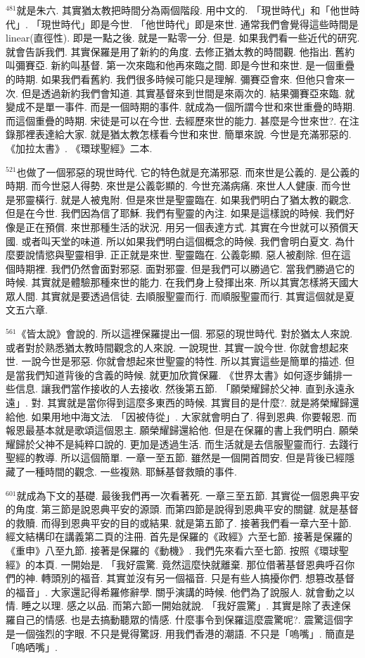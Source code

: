 \documentclass{book}
\begin{document}
$^{481}$就是朱六.
其實猶太教把時間分為兩個階段.
用中文的.
「現世時代」和「他世時代」.
「現世時代」即是今世.
「他世時代」即是來世.
通常我們會覺得這些時間是linear(直徑性).
即是一點之後.
就是一點零一分.
但是.
如果我們看一些近代的研究.
就會告訴我們.
其實保羅是用了新約的角度.
去修正猶太教的時間觀.
他指出.
舊約叫彌賽亞.
新約叫基督.
第一次來臨和他再來臨之間.
即是今世和來世.
是一個重疊的時期.
如果我們看舊約.
我們很多時候可能只是理解.
彌賽亞會來.
但他只會來一次.
但是透過新約我們會知道.
其實基督來到世間是來兩次的.
結果彌賽亞來臨.
就變成不是單一事件.
而是一個時期的事件.
就成為一個所謂今世和來世重疊的時期.
而這個重疊的時期.
宋徒是可以在今世.
去經歷來世的能力.
甚麼是今世來世?.
在注錄那裡表達給大家.
就是猶太教怎樣看今世和來世.
簡單來說.
今世是充滿邪惡的.
《加拉太書》.
《環球聖經》二本.

$^{521}$也做了一個邪惡的現世時代.
它的特色就是充滿邪惡.
而來世是公義的.
是公義的時期.
而今世惡人得勢.
來世是公義彰顯的.
今世充滿病痛.
來世人人健康.
而今世是邪靈橫行.
就是人被鬼附.
但是來世是聖靈臨在.
如果我們明白了猶太教的觀念.
但是在今世.
我們因為信了耶穌.
我們有聖靈的內注.
如果是這樣說的時候.
我們好像是正在預償.
來世那種生活的狀況.
用另一個表達方式.
其實在今世就可以預償天國.
或者叫天堂的味道.
所以如果我們明白這個概念的時候.
我們會明白夏文.
為什麼要說情慾與聖靈相爭.
正正就是來世.
聖靈臨在.
公義彰顯.
惡人被剷除.
但在這個時期裡.
我們仍然會面對邪惡.
面對邪靈.
但是我們可以勝過它.
當我們勝過它的時候.
其實就是體驗那種來世的能力.
在我們身上發揮出來.
所以其實怎樣將天國大眾人間.
其實就是要透過信徒.
去順服聖靈而行.
而順服聖靈而行.
其實這個就是夏文五六章.

$^{561}$《皆太說》會說的.
所以這裡保羅提出一個.
邪惡的現世時代.
對於猶太人來說.
或者對於熟悉猶太教時間觀念的人來說.
一說現世.
其實一說今世.
你就會想起來世.
一說今世是邪惡.
你就會想起來世聖靈的特性.
所以其實這些是簡單的描述.
但是當我們知道背後的含義的時候.
就更加欣賞保羅.
《世界太書》如何逐步鋪排一些信息.
讓我們當作接收的人去接收.
然後第五節.
「願榮耀歸於父神.
直到永遠永遠」.
對.
其實就是當你得到這麼多東西的時候.
其實目的是什麼?.
就是將榮耀歸還給他.
如果用地中海文法.
「因被侍從」.
大家就會明白了.
得到恩典.
你要報恩.
而報恩最基本就是歌頌這個恩主.
願榮耀歸還給他.
但是在保羅的書上我們明白.
願榮耀歸於父神不是純粹口說的.
更加是透過生活.
而生活就是去信服聖靈而行.
去踐行聖經的教導.
所以這個簡單.
一章一至五節.
雖然是一個開首問安.
但是背後已經隱藏了一種時間的觀念.
一些複熟.
耶穌基督救贖的事件.

$^{601}$就成為下文的基礎.
最後我們再一次看著死.
一章三至五節.
其實從一個恩典平安的角度.
第三節是說恩典平安的源頭.
而第四節是說得到恩典平安的關鍵.
就是基督的救贖.
而得到恩典平安的目的或結果.
就是第五節了.
接著我們看一章六至十節.
經文結構印在講義第二頁的注冊.
首先是保羅的《政經》六至七節.
接著是保羅的《重申》八至九節.
接著是保羅的《動機》.
我們先來看六至七節.
按照《環球聖經》的本頁.
一開始是.
「我好震驚.
竟然這麼快就離棄.
那位借著基督恩典呼召你們的神.
轉頭別的福音.
其實並沒有另一個福音.
只是有些人搞擾你們.
想篡改基督的福音」.
大家還記得希羅修辭學.
關乎演講的時候.
他們為了說服人.
就會動之以情.
睡之以理.
感之以品.
而第六節一開始就說.
「我好震驚」.
其實是除了表達保羅自己的情感.
也是去搞動聽眾的情感.
什麼事令到保羅這麼震驚呢?.
震驚這個字是一個強烈的字眼.
不只是覺得驚訝.
用我們香港的潮語.
不只是「嗚嘴」.
簡直是「嗚哂嘴」.
\end{document}
